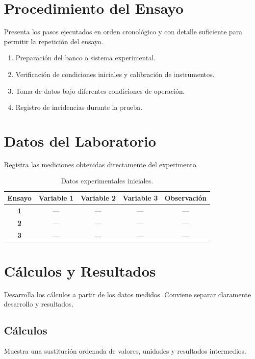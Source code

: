 \documentclass[12pt,a4paper]{article}
\begin{document}
\section{Procedimiento del Ensayo}
Presenta los pasos ejecutados en orden cronol\'ogico y con detalle suficiente para permitir la repetici\'on del ensayo.

\begin{enumerate}[leftmargin=1.5em]
  \item Preparaci\'on del banco o sistema experimental.
  \item Verificaci\'on de condiciones iniciales y calibraci\'on de instrumentos.
  \item Toma de datos bajo diferentes condiciones de operaci\'on.
  \item Registro de incidencias durante la prueba.
\end{enumerate}

\section{Datos del Laboratorio}
Registra las mediciones obtenidas directamente del experimento.

\begin{table}[H]
  \centering
  \renewcommand{\arraystretch}{1.25}
  \begin{tabular}{>{\bfseries}c c c c c}
    \toprule
    Ensayo & Variable 1 & Variable 2 & Variable 3 & Observaci\'on \\
    \midrule
    1 & --- & --- & --- & --- \\
    2 & --- & --- & --- & --- \\
    3 & --- & --- & --- & --- \\
    \bottomrule
  \end{tabular}
  \caption{Datos experimentales iniciales.}
\end{table}

\section{C\'alculos y Resultados}
Desarrolla los c\'alculos a partir de los datos medidos. Conviene separar claramente desarrollo y resultados.

\subsection{C\'alculos}
Muestra una sustituci\'on ordenada de valores, unidades y resultados intermedios.
\end{document}
